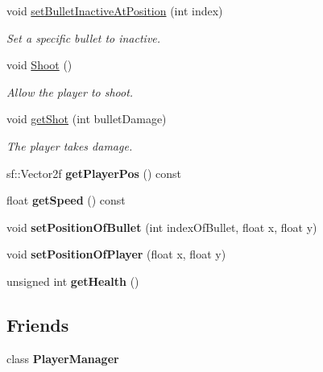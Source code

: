 \begin{DoxyCompactItemize}
void \hyperlink{class_player_a4a72b5ba696e55375ee614ef89a87ade}{set\+Bullet\+Inactive\+At\+Position} (int index)
\begin{DoxyCompactList}\small\item\em Set a specific bullet to inactive. \end{DoxyCompactList}\item 
void \hyperlink{class_player_a2105394431517a41d38140cb65982331}{Shoot} ()
\begin{DoxyCompactList}\small\item\em Allow the player to shoot. \end{DoxyCompactList}\item 
void \hyperlink{class_player_a13e6164daf86c00800992d756339fe51}{get\+Shot} (int bullet\+Damage)
\begin{DoxyCompactList}\small\item\em The player takes damage. \end{DoxyCompactList}\item 
\mbox{\label{class_player_aab8a89629ae8acaf8c1dc4b2e9f052c6}} 
sf\+::\+Vector2f {\bfseries get\+Player\+Pos} () const
\item 
\mbox{\label{class_player_a515920b9f3992375f179ca17ee750dc1}} 
float {\bfseries get\+Speed} () const
\item 
\mbox{\label{class_player_a3bf9c265d1be1284501b8c03ca5bdfb0}} 
void {\bfseries set\+Position\+Of\+Bullet} (int index\+Of\+Bullet, float x, float y)
\item 
\mbox{\label{class_player_abeaa59ae6cd6ca74f269f4af28ef8f82}} 
void {\bfseries set\+Position\+Of\+Player} (float x, float y)
\item 
\mbox{\label{class_player_a1f61cee0029ef492d13e289f34e7764b}} 
unsigned int {\bfseries get\+Health} ()
\end{DoxyCompactItemize}
\subsection*{Friends}
\begin{DoxyCompactItemize}
\item 
\mbox{\label{class_player_af4dd6083207676104071a0b097ff2bff}} 
class {\bfseries Player\+Manager}
\end{DoxyCompactItemize}


